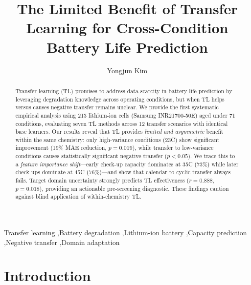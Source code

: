 \documentclass[review]{elsarticle}
\begin{document}
\begin{frontmatter}

\title{The Limited Benefit of Transfer Learning for Cross-Condition Battery Life Prediction}

\author[ajou]{Yongjun Kim}

\address[ajou]{Department of Software, Ajou University, Suwon 16499, Republic of Korea}

\begin{abstract}
Transfer learning (TL) promises to address data scarcity in battery life prediction by leveraging degradation knowledge across operating conditions, but when TL helps versus causes negative transfer remains unclear. We provide the first systematic empirical analysis using 213 lithium-ion cells (Samsung INR21700-50E) aged under 71 conditions, evaluating seven TL methods across 12 transfer scenarios with identical base learners. Our results reveal that TL provides \textit{limited and asymmetric} benefit within the same chemistry: only high-variance conditions (23\textdegree C) show significant improvement (19\% MAE reduction, $p = 0.019$), while transfer to low-variance conditions causes statistically significant negative transfer ($p < 0.05$). We trace this to a \textit{feature importance shift}---early check-up capacity dominates at 35\textdegree C (73\%) while later check-ups dominate at 45\textdegree C (76\%)---and show that calendar-to-cyclic transfer always fails. Target domain uncertainty strongly predicts TL effectiveness ($r = 0.888$, $p = 0.018$), providing an actionable pre-screening diagnostic. These findings caution against blind application of within-chemistry TL.
\end{abstract}

\begin{keyword}
Transfer learning \sep Battery degradation \sep Lithium-ion battery \sep Capacity prediction \sep Negative transfer \sep Domain adaptation
\end{keyword}

\end{frontmatter}

\linenumbers

\section{Introduction}
\label{sec:intro}
\end{document}
